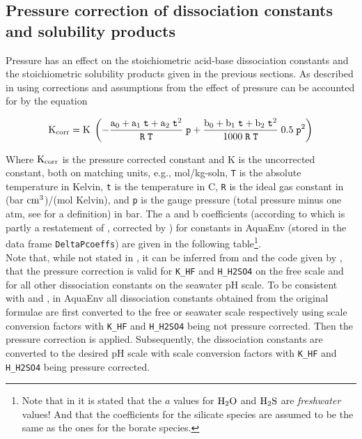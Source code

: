 \documentclass[a4paper]{article}
\begin{document}
\subsection{Pressure correction of dissociation constants and solubility products}
Pressure has an effect on the stoichiometric acid-base dissociation constants  and the stoichiometric solubility products given in the  previous sections. As described in \citet[p. 675]{Millero1995} using corrections and assumptions from \citet[p. A-7]{Lewis1998} the effect of pressure can be accounted for by the equation

\begin{equation}
\rm K_{corr} = K \; \left(- \frac{a_0 + a_1 \; \mbox{\texttt{t}} + a_2 \; \mbox{\texttt{t}}^2}{\mbox{\texttt{R}}\;\mbox{\texttt{T}}} \; \mbox{\texttt{p}} + \frac{b_0 + b_1 \; \mbox{\texttt{t}} + b_2 \; \mbox{\texttt{t}}^2}{1000\;\mbox{\texttt{R}}\;\mbox{\texttt{T}}} \; 0.5 \; \mbox{\texttt{p}}^2\right)
\end{equation}

\noindent
Where $\rm K_{corr}$ is the pressure corrected constant and K is the uncorrected constant, both on matching units, e.g., mol/kg-soln, \texttt{T} is the absolute temperature in Kelvin, \texttt{t} is the temperature in \textdegree$ $C, \texttt{R} is the ideal gas constant in (bar $\rm cm^3$)/(mol Kelvin), and \texttt{p} is the gauge pressure (total pressure minus one atm, see \cite{Feistel2008} for a definition) in bar. The a and b coefficients (according to \citet{Millero1995} which is partly a restatement of \citet{Millero1979}, corrected by \citet{Lewis1998}) for constants in \textsf{AquaEnv} (stored in the data frame \texttt{DeltaPcoeffs}) are given in the following table\footnote{Note that in \citet{Lewis1998} it is stated that the $a$ values for $\rm H_2O$ and $\rm H_2S$ are \textit{freshwater} values! And that the coefficients for the silicate species are assumed to be the same as the ones for the borate species.}.\\

\noindent
Note that, while not stated in \citet{Millero1995}, it can be inferred from \cite{Lewis1998} and the code given by \cite{vanHeuven2009}, that the pressure correction is valid for \texttt{K\_HF} and \texttt{H\_H2SO4} on the free scale and for all other dissociation constants on the seawater pH scale. To be consistent with \cite{Lewis1998} and \cite{vanHeuven2009}, in \textsf{AquaEnv} all dissociation constants obtained from the original formulae are first converted to the free or seawater scale respectively using scale conversion factors with \texttt{K\_HF} and \texttt{H\_H2SO4} being not pressure corrected. Then the pressure correction is applied. Subsequently, the dissociation constants are converted to the desired pH scale with scale conversion factors with \texttt{K\_HF} and \texttt{H\_H2SO4} being pressure corrected.
\end{document}
